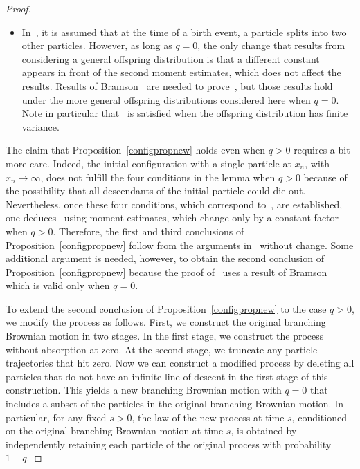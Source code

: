 \documentclass[10pt]{amsart}
\theoremstyle{definition}\newtheorem{defi}[theo]{Definition}\newtheorem{rema}[theo]{Remark}\newtheorem{exam}[theo]{Example}\newtheorem{exem}[theo]{Example}\newtheorem{nota}[theo]{Notation}
\newcommand{\1} {\mathds{1}}
\begin{document}
\begin{proof}
\begin{itemize}
\item In~\cite{bbs3}, it is assumed that at the time of a birth event, a particle splits into two other particles. However, as long as $q = 0$, the only change that results from considering a general offspring distribution is that a different constant appears in front of the second moment estimates, which does not affect the results. Results of Bramson~\cite{bram83} are needed to prove~\cite[Theorem~2]{bbs3}, but those results hold under the more general offspring distributions considered here when $q = 0$. Note in particular that~\cite[equation~(1.2$'$) on page~5]{bram83} is satisfied when the offspring distribution has finite variance.
\end{itemize}
The claim that Proposition~\ref{configpropnew} holds even when $q > 0$ requires a bit more care. Indeed, the initial configuration with a single particle at $x_n$, with $x_n \rightarrow \infty$, does not fulfill the four conditions in the lemma when $q > 0$ because of the possibility that all descendants of the initial particle could die out. Nevertheless, once these four conditions, which correspond to~\cite[Lemma~15]{bbs3}, are established, one deduces~\cite[Theorems~1, 3, and~4]{bbs3} using moment estimates, which change only by a constant factor when $q > 0$. Therefore, the first and third conclusions of Proposition~\ref{configpropnew} follow from the arguments in~\cite{bbs3} without change. Some additional argument is needed, however, to obtain the second conclusion of Proposition~\ref{configpropnew} because the proof of~\cite[Theorem~2]{bbs3} uses a result of Bramson~\cite{bbs3} which is valid only when $q = 0$.

To extend the second conclusion of Proposition~\ref{configpropnew} to the case $q > 0$, we modify the process as follows. First, we construct the original branching Brownian motion in two stages. In the first stage, we construct the process without absorption at zero. At the second stage, we truncate any particle trajectories that hit zero. Now we can construct a modified process by deleting all particles that do not have an infinite line of descent in the first stage of this construction. This yields a new branching Brownian motion with $q = 0$ that includes a subset of the particles in the original branching Brownian motion. In particular, for any fixed $s > 0$, the law of the new process at time $s$, conditioned on the original branching Brownian motion at time $s$, is obtained by independently retaining each particle of the original process with probability $1 - q$.


\end{proof}
\end{document}
